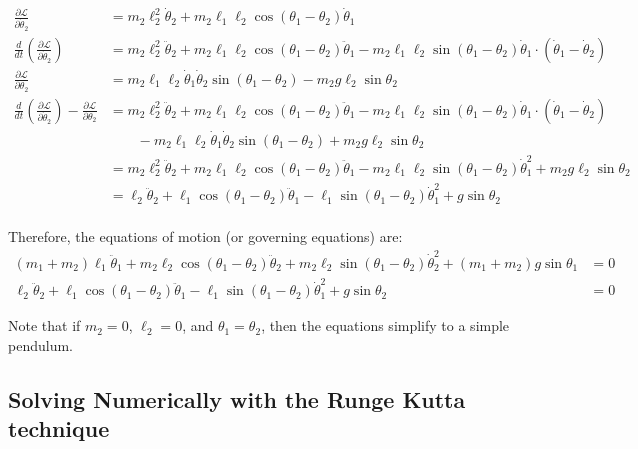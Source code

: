 \documentclass[letterpaper,8pt]{article}
\begin{document}
\begin{align*}
\frac{\partial \mathcal{L}}{\partial \dot{\theta}_2} &= m_2 \ell_2^2 \dot{\theta}_2 + m_2\ell_1\ell_2 \cos(\theta_1 - \theta_2) \dot{\theta}_1 \\
\frac{d}{dt} \left( \frac{\partial \mathcal{L}}{\partial \dot{\theta}_2} \right) &= m_2 \ell_2^2 \ddot{\theta}_2 
    + m_2\ell_1\ell_2 \cos(\theta_1 - \theta_2) \ddot{\theta}_1 - m_2\ell_1\ell_2 \sin (\theta_1 - \theta_2) \dot{\theta}_1 \cdot (\dot{\theta}_1 - \dot{\theta}_2) \\
\frac{\partial \mathcal{L}}{\partial \theta_2} &= m_2 \ell_1\ell_2 \dot{\theta}_1 \dot{\theta}_2 \sin (\theta_1 - \theta_2) - m_2 g \ell_2 \sin \theta_2 \\
\frac{d}{dt} \left( \frac{\partial \mathcal{L}}{\partial \dot{\theta}_2} \right) - \frac{\partial \mathcal{L}}{\partial \theta_2} &= 
       m_2 \ell_2^2 \ddot{\theta}_2 + m_2\ell_1\ell_2 \cos(\theta_1 - \theta_2) \ddot{\theta}_1 - m_2\ell_1\ell_2 \sin (\theta_1 - \theta_2) \dot{\theta}_1 \cdot (\dot{\theta}_1 - \dot{\theta}_2) \\
  &\qquad - m_2 \ell_1\ell_2 \dot{\theta}_1 \dot{\theta}_2 \sin (\theta_1 - \theta_2) + m_2 g \ell_2 \sin \theta_2 \\
  &= m_2 \ell_2^2 \ddot{\theta}_2 + m_2\ell_1\ell_2 \cos(\theta_1 - \theta_2) \ddot{\theta}_1 - m_2 \ell_1\ell_2 \sin (\theta_1 - \theta_2) \dot{\theta}_1^2 
       + m_2 g \ell_2 \sin \theta_2 \\
  &= \ell_2 \ddot{\theta}_2 + \ell_1 \cos(\theta_1 - \theta_2) \ddot{\theta}_1 - \ell_1 \sin (\theta_1 - \theta_2) \dot{\theta}_1^2 + g \sin \theta_2 \\
\end{align*}

Therefore, the equations of motion (or governing equations) are:
\begin{align*}
(m_1 + m_2)\ell_1 \ddot{\theta}_1 + m_2 \ell_2 \cos (\theta_1 - \theta_2) \ddot{\theta}_2
          + m_2\ell_2 \sin (\theta_1 - \theta_2) \dot{\theta}_2^2 + (m_1 + m_2) g \sin \theta_1 &= 0 \\
  \ell_2 \ddot{\theta}_2 + \ell_1 \cos(\theta_1 - \theta_2) \ddot{\theta}_1 - \ell_1 \sin (\theta_1 - \theta_2) \dot{\theta}_1^2 + g \sin \theta_2 &= 0 
\end{align*}

Note that if $m_2 = 0$, $\ell_2 = 0$, and $\theta_1 = \theta_2$, then the equations simplify to a simple pendulum.

\subsection{Solving Numerically with the Runge Kutta technique}
\end{document}
